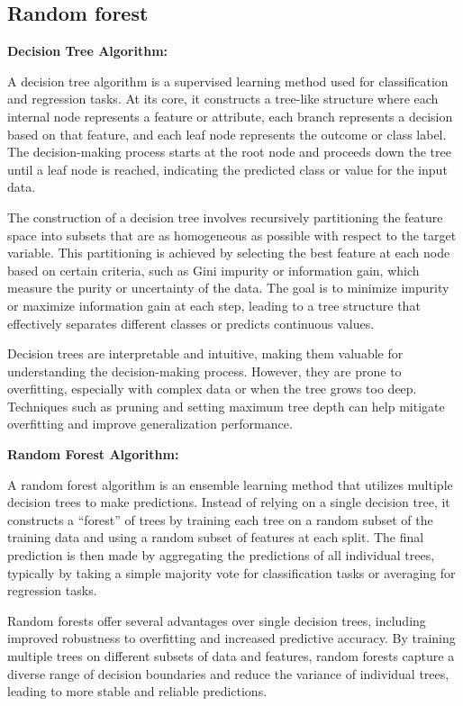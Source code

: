 \documentclass[preprint,aps,nofootinbib,a4paper,superscriptaddress,longbibliography,amsfonts,amssymb,amsmath,titlepage]{revtex4-2}
\begin{document}
\subsection{Random forest}

\textbf{Decision Tree Algorithm:}

A decision tree algorithm is a supervised learning method used for classification and regression tasks. At its core, it constructs a tree-like structure where each internal node represents a feature or attribute, each branch represents a decision based on that feature, and each leaf node represents the outcome or class label. The decision-making process starts at the root node and proceeds down the tree until a leaf node is reached, indicating the predicted class or value for the input data.

The construction of a decision tree involves recursively partitioning the feature space into subsets that are as homogeneous as possible with respect to the target variable. This partitioning is achieved by selecting the best feature at each node based on certain criteria, such as Gini impurity or information gain, which measure the purity or uncertainty of the data. The goal is to minimize impurity or maximize information gain at each step, leading to a tree structure that effectively separates different classes or predicts continuous values.

Decision trees are interpretable and intuitive, making them valuable for understanding the decision-making process. However, they are prone to overfitting, especially with complex data or when the tree grows too deep. Techniques such as pruning and setting maximum tree depth can help mitigate overfitting and improve generalization performance.

\textbf{Random Forest Algorithm:}

A random forest algorithm is an ensemble learning method that utilizes multiple decision trees to make predictions. Instead of relying on a single decision tree, it constructs a ``forest'' of trees by training each tree on a random subset of the training data and using a random subset of features at each split. The final prediction is then made by aggregating the predictions of all individual trees, typically by taking a simple majority vote for classification tasks or averaging for regression tasks.

Random forests offer several advantages over single decision trees, including improved robustness to overfitting and increased predictive accuracy. By training multiple trees on different subsets of data and features, random forests capture a diverse range of decision boundaries and reduce the variance of individual trees, leading to more stable and reliable predictions.
\end{document}
